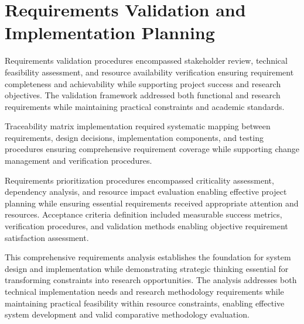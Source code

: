 \section{Requirements Validation and Implementation Planning}

Requirements validation procedures encompassed stakeholder review, technical feasibility assessment, and resource availability verification ensuring requirement completeness and achievability while supporting project success and research objectives. The validation framework addressed both functional and research requirements while maintaining practical constraints and academic standards.

Traceability matrix implementation required systematic mapping between requirements, design decisions, implementation components, and testing procedures ensuring comprehensive requirement coverage while supporting change management and verification procedures.


Requirements prioritization procedures encompassed criticality assessment, dependency analysis, and resource impact evaluation enabling effective project planning while ensuring essential requirements received appropriate attention and resources. Acceptance criteria definition included measurable success metrics, verification procedures, and validation methods enabling objective requirement satisfaction assessment.

This comprehensive requirements analysis establishes the foundation for system design and implementation while demonstrating strategic thinking essential for transforming constraints into research opportunities. The analysis addresses both technical implementation needs and research methodology requirements while maintaining practical feasibility within resource constraints, enabling effective system development and valid comparative methodology evaluation.